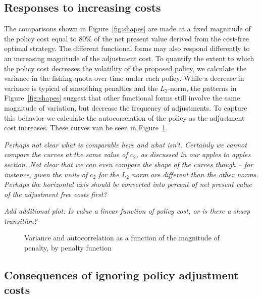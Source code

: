 \documentclass[authoryear, review, 12pt]{elsarticle}
\newcommand{\cdb}[1]{{\it \color{darkgreen} #1}}
\begin{document}
\subsection{Responses to increasing costs}

The comparisons shown in Figure~\ref{fig:shapes} are made at a fixed magnitude of the policy cost equal to 80\% of the net present value derived from the cost-free optimal strategy.  The different functional forms may also respond differently to an increasing magnitude of the adjustment cost.  To quantify the extent to which the policy cost decreases the volatility of the proposed policy, we calculate the variance in the fishing quota over time under each policy.  While a decrease in variance is typical of smoothing penalties and the $L_2$-norm, the patterns in Figure~\ref{fig:shapes} suggest that other functional forms still involve the same magnitude of variation, but decrease the frequency of adjustments.  To capture this behavior we calculate the autocorrelation of the policy as the adjustment cost increases.  These curves van be seen in Figure~\ref{fig:summarystats}.  


\cdb{Perhaps not clear what is comparable here and what isn't.  Certainly we cannot compare the curves at the same value of $c_2$, as discussed in our apples to apples section.  Not clear that we can even compare the shape of the curves though -- for instance, given the units of $c_2$ for the $L_2$ norm are different than the other norms.  Perhaps the horizontal axis should be converted into percent of net present value of the adjustment free costs first?}

\cdb{Add additional plot: Is value a linear function of policy cost, or is there a sharp transition? }




\begin{figure}
  \begin{center}
    \caption{Variance and autocorrelation as a function of the magnitude of penalty, by penalty function}\label{fig:summarystats}
  \end{center}
\end{figure}


\subsection{Consequences of ignoring policy adjustment costs}
\end{document}

